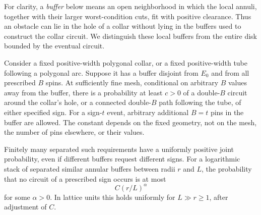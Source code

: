 For clarity, a \emph{buffer} below means an open neighborhood in which
the local annuli, together with their larger worst-condition cuts, fit
with positive clearance.  Thus an obstacle can lie in the hole of a
collar without lying in the buffers used to construct the collar circuit.
We distinguish these local buffers from the entire disk bounded by the
eventual circuit.

\begin{lemma}\label{lem:buffer-circuits}
Consider a fixed positive-width polygonal collar, or a fixed positive-width
tube following a polygonal arc.  Suppose it has a buffer disjoint from
$E_0$ and from all prescribed $B$ spins.  At sufficiently fine mesh,
conditional on arbitrary $B$ values away from the buffer, there is a
probability at least $c>0$ of a double-$B$ circuit around the collar's hole,
or a connected double-$B$ path following the tube, of either specified sign.
For a sign-$t$ event, arbitrary additional $B=t$ pins in the buffer are
allowed.  The constant depends on the fixed geometry, not on the mesh,
the number of pins elsewhere, or their values.

Finitely many separated such requirements have a uniformly positive joint
probability, even if different buffers request different signs.  For a
logarithmic stack of separated similar annular buffers between radii $r$
and $L$, the probability that no circuit of a prescribed sign occurs is
at most
\begin{equation}\label{eq:stack-failure}
 C(r/L)^\alpha
\end{equation}
for some $\alpha>0$.  In lattice units this holds uniformly for $L\gg r\geq1$,
after adjustment of $C$.
\end{lemma}

